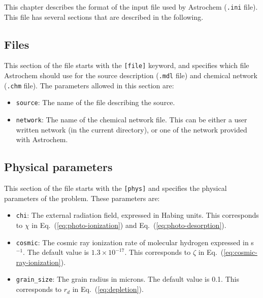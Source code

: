 \documentclass[a4paper,12pt]{article}
\begin{document}
{This chapter describes the format of the input file used by Astrochem
(\verb=.ini= file). This file has several sections that are described
in the following.

\subsection{Files}
\label{sec:files}

This section of the file starts with the \verb=[file]= keyword, and
specifies which file Astrochem should use for the source description
(\verb=.mdl= file) and chemical network (\verb=.chm= file). The
parameters allowed in this section are:

\begin{itemize}

\item \verb=source=: The name of the file describing the source.

\item \verb=network=: The name of the chemical network file. This can
  be either a user written network (in the current directory), or one
  of the network provided with Astrochem.

\end{itemize}

\subsection{Physical parameters}
\label{sec:physical-parameters}

This section of the file starts with the \verb=[phys]= and specifies
the physical parameters of the problem. These parameters are:

\begin{itemize}

\item \verb=chi=: The external radiation field, expressed in Habing
  units. This corresponds to $\chi$ in Eq.~(\ref{eq:photo-ionization})
  and Eq.~(\ref{eq:photo-desorption}).

\item \verb=cosmic=: The cosmic ray ionization rate of molecular
  hydrogen expressed in s$^{-1}$. The default value is $1.3 \times
  10^{-17}$. This corresponds to $\zeta$ in
  Eq.~(\ref{eq:cosmic-ray-ionization}).

\item \verb=grain_size=: The grain radius in microns. The default
  value is 0.1. This corresponds to $r_{d}$ in
  Eq.~(\ref{eq:depletion}).


\end{itemize}}
\end{document}
